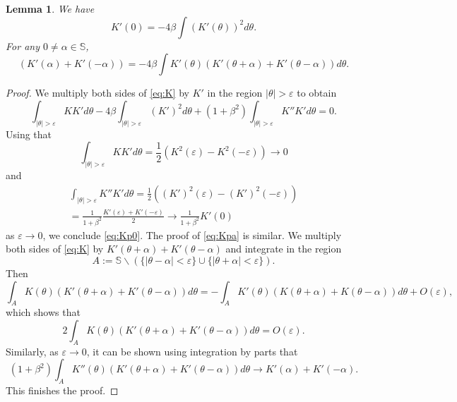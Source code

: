 \documentclass[JEP,XML,SOM,Unicode,NoFloatCountersInSection,published]{cedram}
\theoremstyle{plain}
\newtheorem{lemma}[theorem]{Lemma}
\theoremstyle{definition}
\let\alp\alpha
\let\bt\beta
\let\tht\theta
\newcommand{\bbS}{\mathbb S}
\begin{document}
\begin{lemma} We have\vspace*{-3pt}
\begin{equation}\label{eq:Kp0}
K'(0) = - 4\bt \int (K'(\tht))^2 d\tht.
\end{equation}
For any $0 \ne \alp \in \bbS$,\vspace*{-3pt}
\begin{equation}\label{eq:Kpa}
\left(K'(\alp) + K'(-\alp) \right)= -4\bt \int K'(\tht) \left(K'(\tht+\alp) + K'(\tht-\alp) \right) d\tht.
\end{equation}
\end{lemma}
\begin{proof}
We multiply both sides of \eqref{eq:K} by $K'$ in the region $|\tht|>\varepsilon$ to obtain
\begin{equation*}
\int_{ |\tht |>\varepsilon} KK' d\tht - 4\bt \int_{ |\tht |>\varepsilon} (K')^2d\tht + (1+\bt^2) \int_{ |\tht |>\varepsilon} K''K' d\tht = 0.
\end{equation*}
Using that\vspace*{-3pt}
\begin{equation*}
\int_{ |\tht |>\varepsilon} KK' d\tht = \frac12 \left(K^2(\varepsilon)-K^2(-\varepsilon) \right) \to 0
\end{equation*}
and\vspace*{-3pt}
\begin{multline*}
\int_{ |\tht |>\varepsilon} K''K' d\tht = \frac12 \left((K')^2(\varepsilon) - (K')^2(-\varepsilon) \right)\\[-7pt]
= \frac{1}{1+\bt^2} \frac{ K'(\varepsilon) + K'(-\varepsilon) }{2} \to \frac{1}{1+\bt^2} K'(0)
\end{multline*}
as $\varepsilon\to0$, we conclude \eqref{eq:Kp0}. The proof of \eqref{eq:Kpa} is similar. We multiply both sides of \eqref{eq:K} by $K'(\tht+\alp)+K'(\tht-\alp)$ and integrate in the region
\[
A:= \bbS\backslash (\{ |\tht-\alp|<\varepsilon \} \cup \{ |\tht+\alp|<\varepsilon \}).
\]
Then
\begin{equation*}
\int_A K(\tht) (K'(\tht+\alp)+K'(\tht-\alp)) d\tht = -\int_A K'(\tht) (K(\tht+\alp) + K(\tht-\alp)) d\tht + O(\varepsilon),
\end{equation*}
which shows that\vspace*{-3pt}
\begin{equation*}
2\int_A K(\tht) (K'(\tht+\alp)+K'(\tht-\alp)) d\tht = O(\varepsilon).
\end{equation*}
Similarly, as $\varepsilon\to0$, it can be shown using integration by parts that\vspace*{-3pt}
\begin{equation*}
(1+\bt^2)\int_{A} K''(\tht)(K'(\tht+\alp)+K'(\tht-\alp)) d\tht \to K'(\alp) + K'(-\alp).
\end{equation*}
This finishes the proof.
\end{proof}
\end{document}
